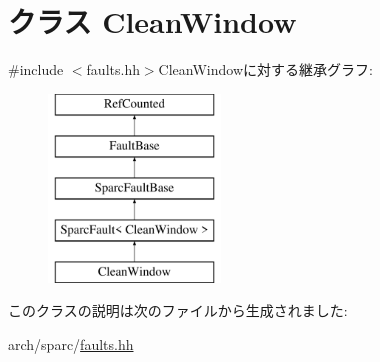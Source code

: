 \hypertarget{classSparcISA_1_1CleanWindow}{
\section{クラス CleanWindow}
\label{classSparcISA_1_1CleanWindow}
}


{\ttfamily \#include $<$faults.hh$>$}CleanWindowに対する継承グラフ:\begin{figure}[H]
\begin{center}
\leavevmode
\includegraphics[height=5cm]{classSparcISA_1_1CleanWindow}
\end{center}
\end{figure}


このクラスの説明は次のファイルから生成されました:\begin{DoxyCompactItemize}
\item 
arch/sparc/\hyperlink{arch_2sparc_2faults_8hh}{faults.hh}\end{DoxyCompactItemize}
